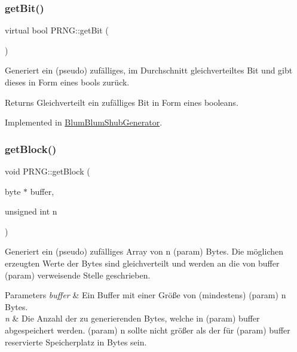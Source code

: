 \subsubsection{\texorpdfstring{get\+Bit()}{getBit()}}
{\footnotesize\ttfamily virtual bool P\+R\+N\+G\+::get\+Bit (\begin{DoxyParamCaption}{ }\end{DoxyParamCaption})\hspace{0.3cm}{\ttfamily [pure virtual]}}

Generiert ein (pseudo) zufälliges, im Durchschnitt gleichverteiltes Bit und gibt dieses in Form eines bools zurück.

\begin{DoxyReturn}{Returns}
Gleichverteilt ein zufälliges Bit in Form eines booleans. 
\end{DoxyReturn}


Implemented in \hyperlink{classBlumBlumShubGenerator_aa25d1b6bc4686e6fecd254877b472d39}{Blum\+Blum\+Shub\+Generator}.

\mbox{\label{classPRNG_a1b48ca02baade80760485574d2a84644}} 
\subsubsection{\texorpdfstring{get\+Block()}{getBlock()}}
{\footnotesize\ttfamily void P\+R\+N\+G\+::get\+Block (\begin{DoxyParamCaption}\item[{byte $\ast$}]{buffer,  }\item[{unsigned int}]{n }\end{DoxyParamCaption})\hspace{0.3cm}{\ttfamily [virtual]}}

Generiert ein (pseudo) zufälliges Array von n (param) Bytes. Die möglichen erzeugten Werte der Bytes sind gleichverteilt und werden an die von \textquotesingle{}buffer\textquotesingle{} (param) verweisende Stelle geschrieben.


\begin{DoxyParams}{Parameters}
{\em buffer} & Ein Buffer mit einer Größe von (mindestens) (param) n Bytes.\\
\hline
{\em n} & Die Anzahl der zu generierenden Bytes, welche in (param) buffer abgespeichert werden. (param) n sollte nicht größer als der für (param) buffer reservierte Speicherplatz in Bytes sein. \\
\hline
\end{DoxyParams}
\mbox{\label{classPRNG_aaef8a8a16c7a871a85262e26a19b9048}} 
